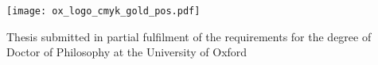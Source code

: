 \documentclass[dissertation]{subfiles}
\begin{document}
\begin{titlepage}

\begin{center}

\vspace*{36pt}

\newlength{\titlewordspace}
\setlength{\titlewordspace}{.7em}

\newlength{\titlecharspace}
\setlength{\titlecharspace}{1pt}


\vspace{36pt}



\vspace{\fill}
\vspace{\fill}

\texttt{[image: ox\_logo\_cmyk\_gold\_pos.pdf]}

\vspace{\fill}

Thesis submitted in partial fulfilment of the requirements for the degree of Doctor of Philosophy at the University of Oxford

\timestamp

\end{center}

\end{titlepage}
\end{document}
